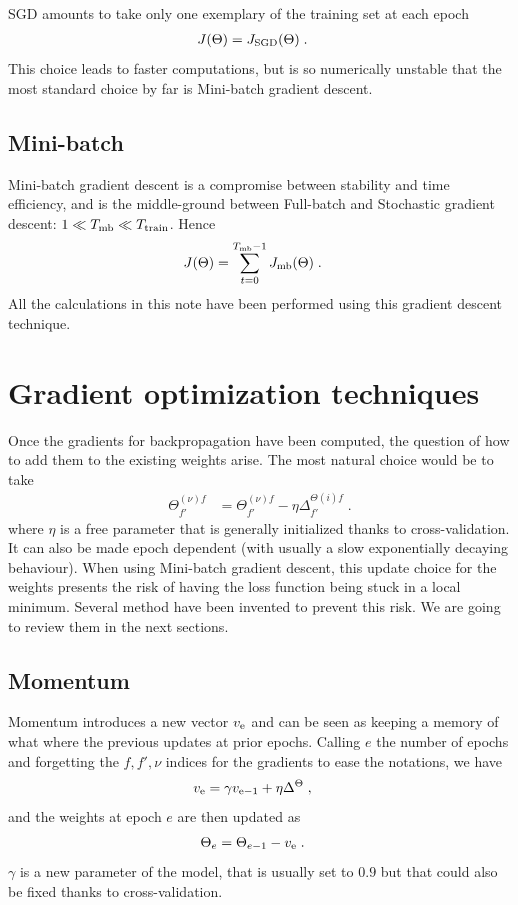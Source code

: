 SGD amounts to take only one exemplary of the training set at each epoch
\begin{align}
J(\Theta)&=J_{{\rm SGD}}(\Theta)\;.
\end{align}
This choice leads to faster computations, but is so numerically unstable that the most standard choice by far is Mini-batch gradient descent.

\subsection{Mini-batch}

Mini-batch gradient descent is a compromise between stability and time efficiency, and is the middle-ground between Full-batch and Stochastic gradient descent: $1\ll T_{{\rm mb}}\ll T_{{\rm train}}$. Hence
\begin{align}
J(\Theta)&=\sum_{t=0}^{T_{{\rm mb}}-1}J_{{\rm mb}}(\Theta)\;.
\end{align}
All the calculations in this note have been performed using this gradient descent technique.

\section{Gradient optimization techniques}

Once the gradients for backpropagation have been computed, the question of how to add them to the existing weights arise. The most natural choice would be to take
\begin{align}
\Theta^{(\nu)f}_{f'}&=\Theta^{(\nu)f}_{f'}-\eta\Delta^{\Theta(i)f}_{f'}\;.
\end{align}
where $\eta$ is a free parameter that is generally initialized thanks to cross-validation. It can also be made epoch dependent (with usually a slow exponentially decaying behaviour). When using Mini-batch gradient descent, this update choice for the weights presents the risk of having the loss function being stuck in a local minimum. Several method have been invented to prevent this risk. We are going to review them in the next sections.


\subsection{Momentum}

Momentum\cite{QIAN1999145} introduces a new vector $v_{{\rm e}}$ and can be seen as keeping a memory of what where the previous updates at prior epochs. Calling $e$ the number of epochs and forgetting the $f,f',\nu$ indices for the gradients to ease the notations, we have
\begin{align}
v_{{\rm e}}&=\gamma v_{{\rm e-1}}+\eta \Delta^{\Theta}\;,
\end{align}
and the weights at epoch $e$ are then updated as
\begin{align}
\Theta_e&=\Theta_{e-1}-v_{{\rm e}}\;.
\end{align}
$\gamma$ is a new parameter of the model, that is usually set to $0.9$ but that could also be fixed thanks to cross-validation.

